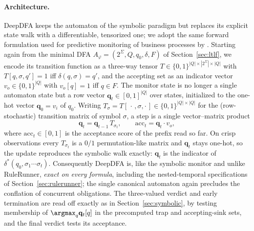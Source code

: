 \paragraph{Architecture.}
DeepDFA \cite{deepdfa_ecai2024} keeps the automaton of the symbolic paradigm but replaces its explicit state walk with a differentiable, tensorized one; we adopt the same forward formulation used for predictive monitoring of business processes by \cite{mezini2025neuro}. Starting again from the minimal DFA $A_\varphi = (2^\Sigma, Q, q_0, \delta, F)$ of Section~\ref{sec:ltlf}, we encode its transition function as a three-way tensor $T \in \{0,1\}^{|Q| \times |2^\Sigma| \times |Q|}$ with $T[q, \sigma, q'] = 1$ iff $\delta(q, \sigma) = q'$, and the accepting set as an indicator vector $v_o \in \{0,1\}^{|Q|}$ with $v_o[q] = 1$ iff $q \in F$. The monitor state is no longer a single automaton state but a row vector $\mathbf{q}_t \in [0,1]^{|Q|}$ over states, initialized to the one-hot vector $\mathbf{q}_0 = v_i$ of $q_0$. Writing $T_\sigma = T[\,\cdot\,, \sigma, \cdot\,] \in \{0,1\}^{|Q| \times |Q|}$ for the (row-stochastic) transition matrix of symbol $\sigma$, a step is a single vector--matrix product
\begin{equation}
  \mathbf{q}_t = \mathbf{q}_{t-1}\, T_{\sigma_t},
  \qquad
  \mathrm{acc}_t = \mathbf{q}_t \cdot v_o,
  \label{eq:deepdfa-crisp}
\end{equation}
where $\mathrm{acc}_t \in [0,1]$ is the acceptance score of the prefix read so far. On crisp observations every $T_{\sigma_t}$ is a $0/1$ permutation-like matrix and $\mathbf{q}_t$ stays one-hot, so the update reproduces the symbolic walk exactly: $\mathbf{q}_t$ is the indicator of $\delta^*(q_0, \sigma_1 \cdots \sigma_t)$. Consequently DeepDFA is, like the symbolic monitor and unlike RuleRunner, \emph{exact on every} \ltlf \emph{formula}, including the nested-temporal specifications of Section~\ref{sec:rulerunner}; the single canonical automaton again precludes the conflation of concurrent obligations. The three-valued verdict and early termination are read off exactly as in Section~\ref{sec:symbolic}, by testing membership of $\argmax_q \mathbf{q}_t[q]$ in the precomputed trap and accepting-sink sets, and the final verdict tests its acceptance.

